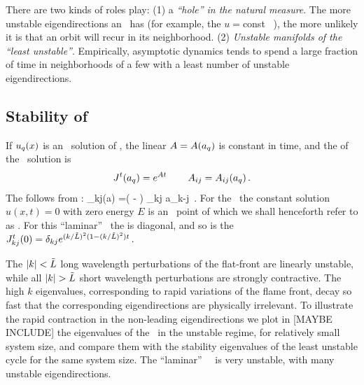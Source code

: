 %
There are two kinds of roles
{\eqva} play:
(1)
a {\em ``hole'' in the natural measure}.
The more unstable eigendirections an \eqv\ has (for example, the
$u=$const \eqv~), the more unlikely it is  that
an orbit will recur in its neighborhood.
(2)
{\em Unstable manifolds of the ``least unstable''{\eqva}}.
Empirically, asymptotic dynamics tends to spend
a large fraction of time in
neighborhoods of a few  {\eqva} with
a least number of unstable eigendirections.



\subsection{Stability of \eqva}
\label{s:StabEqui}

If $u_q(x)$ is an \eqv\ solution of \KSe,
the linear {\stabmat}
${A}={A}(a_q)$
is constant in time,
and
the {\jacobianM}
of the \eqv\ solution is
\[
 {J}^t(a_q) = e^{{A} t}
    \,\qquad
 A_{ij}= A_{ij}(a_q)
\,.
\]
The {\stabmat}
follows from :
\beq
{\Mvar}_{kj}(a) %
=\left(  -   \right)
  \delta_{kj}  a_{k-j}
\,.
For the \KSe\ the constant solution $u(x,t)=0$ with zero energy $E$ is an
\eqv\ point of  which we shall henceforth refer to as
. For this ``laminar'' \eqv\ the {\stabmat}
is diagonal, and
so is the {\jacobianM}
$
{J}^t_{kj}(0) = \delta_{kj} e^{(k/\tilde{L})^2(1- (k/\tilde{L})^2)t}
\,.
$

The $|k|<\tilde{L}$
long wavelength perturbations of the flat-front {\eqv}
are linearly unstable, while all
$|k|> \tildeL$ short wavelength perturbations are strongly contractive.
The high $k$ eigenvalues, corresponding to rapid variations of
the flame front, decay so fast that the corresponding eigendirections
are physically irrelevant.
To illustrate the rapid contraction in the non-leading eigendirections
we plot  in [MAYBE INCLUDE] %
the eigenvalues of the \eqv\ in the unstable regime,
for relatively small system size, %
and compare them with the
stability eigenvalues of the least unstable cycle for the same
system size.
The ``laminar'' ~\eqv\ is very unstable,
with many unstable eigendirections.


